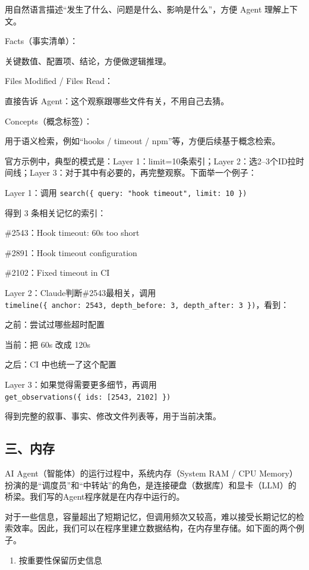 用自然语言描述``发生了什么、问题是什么、影响是什么''，方便 Agent 理解上下文。

Facts（事实清单）：

关键数值、配置项、结论，方便做逻辑推理。

Files Modified / Files Read：

直接告诉 Agent：这个观察跟哪些文件有关，不用自己去猜。

Concepts（概念标签）：

用于语义检索，例如``hooks / timeout / npm''等，方便后续基于概念检索。

官方示例中，典型的模式是：Layer 1：limit=10条索引；Layer 2：选2--3个ID拉时间线；Layer 3：对于其中有必要的，再完整观察。下面举一个例子：

Layer 1：调用 \texttt{search(\{\ query:\ "hook\ timeout",\ limit:\ 10\ \})}

得到 3 条相关记忆的索引：

\#2543：Hook timeout: 60s too short

\#2891：Hook timeout configuration

\#2102：Fixed timeout in CI

Layer 2：Claude判断\#2543最相关，调用 \texttt{timeline(\{\ anchor:\ 2543,\ depth\_before:\ 3,\ depth\_after:\ 3\ \})}，看到：

之前：尝试过哪些超时配置

当前：把 60s 改成 120s

之后：CI 中也统一了这个配置

Layer 3：如果觉得需要更多细节，再调用 \texttt{get\_observations(\{\ ids:\ {[}2543,\ 2102{]}\ \})}

得到完整的叙事、事实、修改文件列表等，用于当前决策。

\hypertarget{ux4e09ux5185ux5b58}{%
\subsection{三、内存}\label{ux4e09ux5185ux5b58}}

AI Agent（智能体）的运行过程中，系统内存（System RAM / CPU Memory）扮演的是``调度员''和``中转站''的角色，是连接硬盘（数据库）和显卡（LLM）的桥梁。我们写的Agent程序就是在内存中运行的。

对于一些信息，容量超出了短期记忆，但调用频次又较高，难以接受长期记忆的检索效率。因此，我们可以在程序里建立数据结构，在内存里存储。如下面的两个例子。

\begin{enumerate}
\def\labelenumi{\arabic{enumi}.}
\tightlist
\item
  按重要性保留历史信息
\end{enumerate}

